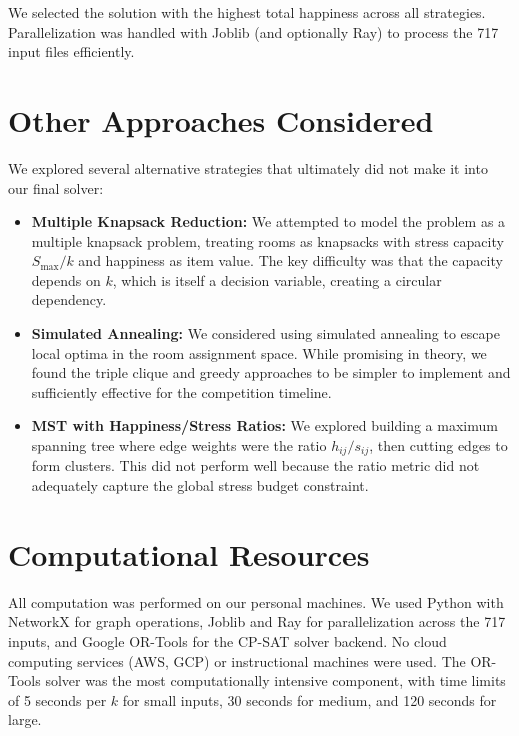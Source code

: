 \documentclass[11pt]{article}
\begin{document}
We selected the solution with the highest total happiness across all strategies. Parallelization was handled with Joblib (and optionally Ray) to process the 717 input files efficiently.

\section*{Other Approaches Considered}

We explored several alternative strategies that ultimately did not make it into our final solver:

\begin{itemize}[nosep]
    \item \textbf{Multiple Knapsack Reduction:} We attempted to model the problem as a multiple knapsack problem, treating rooms as knapsacks with stress capacity $S_{\max}/k$ and happiness as item value. The key difficulty was that the capacity depends on $k$, which is itself a decision variable, creating a circular dependency.

    \item \textbf{Simulated Annealing:} We considered using simulated annealing to escape local optima in the room assignment space. While promising in theory, we found the triple clique and greedy approaches to be simpler to implement and sufficiently effective for the competition timeline.

    \item \textbf{MST with Happiness/Stress Ratios:} We explored building a maximum spanning tree where edge weights were the ratio $h_{ij}/s_{ij}$, then cutting edges to form clusters. This did not perform well because the ratio metric did not adequately capture the global stress budget constraint.
\end{itemize}

\section*{Computational Resources}

All computation was performed on our personal machines. We used Python with NetworkX for graph operations, Joblib and Ray for parallelization across the 717 inputs, and Google OR-Tools for the CP-SAT solver backend. No cloud computing services (AWS, GCP) or instructional machines were used. The OR-Tools solver was the most computationally intensive component, with time limits of 5 seconds per $k$ for small inputs, 30 seconds for medium, and 120 seconds for large.
\end{document}
